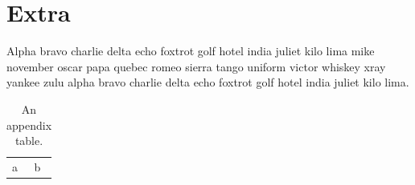 \chapter{Extra}
Alpha bravo charlie delta echo foxtrot golf hotel india juliet kilo lima mike november oscar papa quebec romeo sierra tango uniform victor whiskey xray yankee zulu alpha bravo charlie delta echo foxtrot golf hotel india juliet kilo lima.

\begin{table}[h]
\centering
\caption{An appendix table.}\label{ta}
\begin{tabular}{ll}
a & b\\
\end{tabular}
\end{table}


